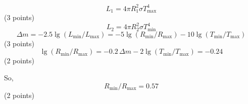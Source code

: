 \[
  L_1 = 4\pi R_1^2 \sigma T_{\max}^4
\]
\hfill(3 points)
\[
  L_2 = 4\pi R_2^2 \sigma T_{\min}^4
\]
\[
  \Delta m = -2.5\lg(L_{\min}/L_{\max})
           = -5\lg(R_{\min}/R_{\max}) - 10\lg(T_{\min}/T_{\max})
\]
\hfill(3 points)
\[
  \lg(R_{\min}/R_{\max}) = -0.2\,\Delta m - 2\lg(T_{\min}/T_{\max}) = -0.24
\]
\hfill(2 points)

So,
\[
  R_{\min}/R_{\max} = 0.57
\]
\hfill(2 points)
